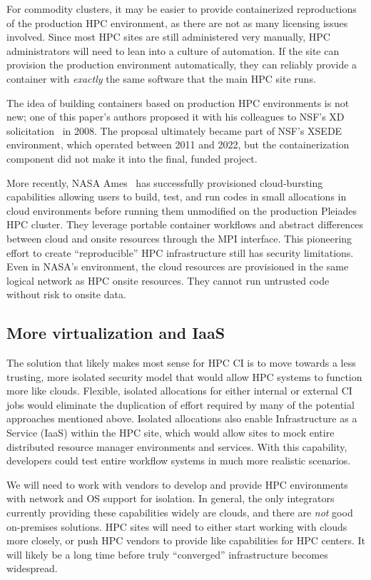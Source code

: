 \documentclass{IEEEcsmag}
\begin{document}
For commodity clusters, it may be easier to provide containerized reproductions of the
production HPC environment, as there are not as many licensing issues involved.
Since most HPC sites are still administered very manually, HPC administrators will need
to lean into a culture of automation. If the site can provision the production environment
automatically, they can reliably provide a container with {\it exactly} the
same software that the main HPC site runs.

The idea of building containers based on production HPC environments is not new; one
of this paper's authors proposed it with his colleagues to NSF's XD
solicitation~\cite{NSF-XD} in 2008.  The proposal ultimately became part of NSF's
XSEDE environment, which operated between 2011 and 2022, but the containerization
component did not make it into the final, funded project.

More recently, NASA Ames~\cite{ames-hybrid-cloud} has successfully provisioned cloud-bursting
capabilities allowing users to build, test, and run codes in small allocations in cloud
environments before running them unmodified on the production Pleiades HPC cluster.
They leverage portable container workflows and abstract differences between cloud and
onsite resources through the MPI interface. This pioneering effort to create
``reproducible'' HPC infrastructure still has security limitations. Even in NASA's
environment, the cloud resources are provisioned in the same logical network as HPC
onsite resources. They cannot run untrusted code without risk to onsite data.

\subsection{More virtualization and IaaS}

The solution that likely makes most sense for HPC CI is to move towards a less trusting,
more isolated security model that would allow HPC systems to function more like clouds.
Flexible, isolated allocations for either internal or external CI jobs would
eliminate the duplication of effort required by many of the potential
approaches mentioned above. Isolated allocations also enable Infrastructure as a Service (IaaS)
within the HPC site, which would allow sites to mock entire distributed resource manager
environments and services. With this capability, developers could test entire workflow systems
in much more realistic scenarios.

We will need to work with vendors to develop and provide HPC environments with network
and OS support for isolation. In general, the only integrators currently providing these
capabilities widely are clouds, and there are {\it not} good on-premises solutions. HPC
sites will need to either start working with clouds more closely, or push
HPC vendors to provide like capabilities for HPC centers. It will likely be a long time
before truly ``converged'' infrastructure becomes widespread.
\end{document}
